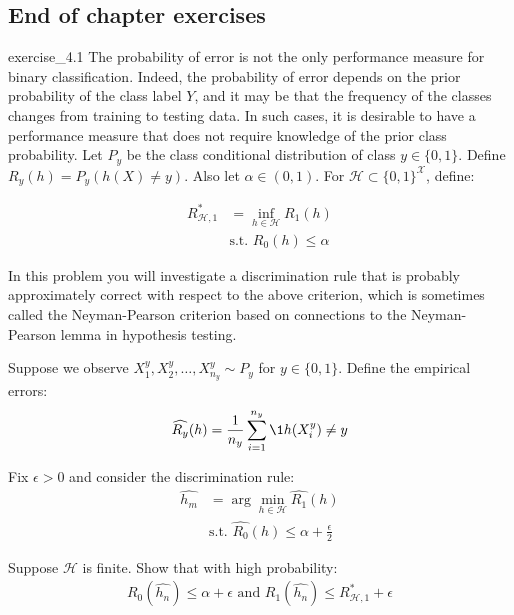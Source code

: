 \subsection{End of chapter exercises}
\begin{exercise}{}{exercise_4.1}
    The probability of error is not the only performance measure for binary classification. Indeed, the
    probability of error depends on the prior probability of the class label $Y$, and it may be that the
    frequency of the classes changes from training to testing data. In such cases, it is desirable to have a performance measure that does not require knowledge of the prior class probability. Let $P_y$ be the class conditional distribution of class $y\in\{0,1\}$. Define $R_y(h)=P_y(h(X) \ne y)$. Also let $\alpha \in (0,1)$. For $\mathcal{H}\subset\{0,1\}^{\mathcal{X}}$, define:

    \begin{align*}
        R^*_{\mathcal{H}, 1} &= \inf_{h\in\mathcal{H}} R_1(h) \\
        &\text{s.t. } R_0(h) \le \alpha 
    \end{align*}

    In this problem you will investigate a discrimination rule that is probably approximately correct with respect to the above criterion, which is sometimes called the Neyman-Pearson criterion based on connections to the Neyman-Pearson lemma in hypothesis testing.

    \noindent Suppose we observe $X_1^y, X_2^y, \dots, X_{n_y}^y \sim P_y$ for $y\in\{0,1\}$. Define the empirical errors:
    \begin{align*}
        \widehat{R_y}(h) = \frac{1}{n_y} \sum_{i=1}^{n_y} \1{h(X_i^y) \ne y}
    \end{align*}

    Fix $\epsilon > 0$ and consider the discrimination rule:
    \begin{align*}
        \widehat{h_m} &= \arg\min_{h\in\mathcal{H}} \widehat{R_1}(h) \\
        &\text{s.t. } \widehat{R_0}(h) \le \alpha + \frac{\epsilon}{2} 
    \end{align*}

    Suppose $\mathcal{H}$ is finite. Show that with high probability:
    \begin{align*}
        R_0(\widehat{h_n}) \le \alpha + \epsilon \text{ and } R_1(\widehat{h_n}) \le R^*_{\mathcal{H}, 1} + \epsilon
    \end{align*}
\end{exercise}